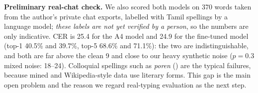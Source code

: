 \begin{table}[t]
\caption{Deployment model against the A4 Transformer it was fine-tuned from (test CER in \%, beam 10, single run each).}
\label{tab:v2}
\centering\scriptsize
\resizebox{\columnwidth}{!}{}
\end{table}

\textbf{Preliminary real-chat check.}
We also scored both models on 370 words taken from the author's private chat exports, labelled with Tamil spellings by a language model; \emph{these labels are not yet verified by a person}, so the numbers are only indicative.
CER is 25.4 for the A4 model and 24.9 for the fine-tuned model (top-1 40.5\% and 39.7\%, top-5 68.6\% and 71.1\%): the two are indistinguishable, and both are far above the clean 9 and close to our heavy synthetic noise ($p{=}0.3$ mixed noise: 18--24).
Colloquial spellings such as \emph{poren} () are the typical failures, because mined and Wikipedia-style data use literary forms.
This gap is the main open problem and the reason we regard real-typing evaluation as the next step.
